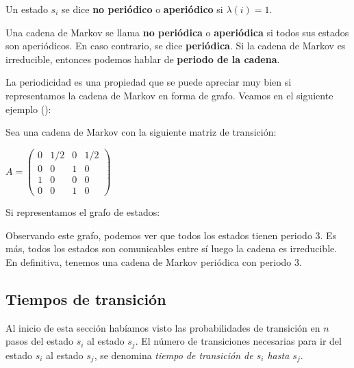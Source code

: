 \begin{definition}
Un estado $s_i$ se dice \textbf{no periódico} o \textbf{aperiódico} si $\lambda(i)=1$. 
\end{definition}
\begin{definition}
Una cadena de Markov se llama \textbf{no periódica} o \textbf{aperiódica} si todos sus estados son aperiódicos. En caso contrario, se dice \textbf{periódica}. Si la cadena de Markov es irreducible, entonces podemos hablar de \textbf{periodo de la cadena}.
\end{definition}
La periodicidad es una propiedad que se puede apreciar muy bien si representamos la cadena de Markov en forma de grafo. Veamos en el siguiente ejemplo (\cite[Página 16]{JuanM}):
\begin{exampleth}
Sea una cadena de Markov con la siguiente matriz de transición:
\begin{center}
    $A=\begin{pmatrix}
    0 & 1/2 & 0 & 1/2 \\
    0 & 0 & 1 & 0 \\
    1 & 0 & 0 & 0 \\
    0 & 0 & 1 & 0
    \end{pmatrix}$
\end{center}
Si representamos el grafo de estados:
    \begin{center}
    \end{center}
Observando este grafo, podemos ver que todos los estados tienen periodo 3. Es más, todos los estados son comunicables entre sí luego la cadena es irreducible. En definitiva, tenemos una cadena de Markov periódica con periodo 3.
\end{exampleth}

\subsection{Tiempos de transición}
Al inicio de esta sección habíamos visto las probabilidades de transición en $n$ pasos del estado $s_i$ al estado $s_j$. El número de transiciones necesarias para ir del estado $s_i$ al estado $s_j$, se denomina \textit{tiempo de transición de $s_i$ hasta $s_j$}.

